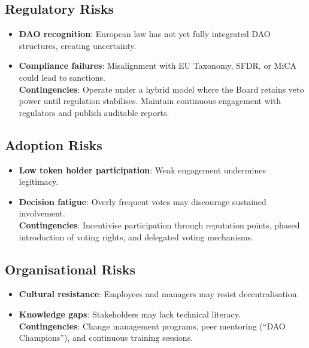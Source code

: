 \documentclass[
  english,
  12pt,
  oneside,
  open=any]{scrbook}
\providecommand{\tightlist}{%
  \setlength{\itemsep}{0pt}\setlength{\parskip}{0pt}}\usepackage{longtable,booktabs,array}
\begin{document}
\subsection{Regulatory Risks}\label{regulatory-risks}

\begin{itemize}
\tightlist
\item
  \textbf{DAO recognition}: European law has not yet fully integrated
  DAO structures, creating uncertainty.\\
\item
  \textbf{Compliance failures}: Misalignment with EU Taxonomy, SFDR, or
  MiCA could lead to sanctions.\\
  \textbf{Contingencies}: Operate under a hybrid model where the Board
  retains veto power until regulation stabilises. Maintain continuous
  engagement with regulators and publish auditable reports.
\end{itemize}

\subsection{Adoption Risks}\label{adoption-risks}

\begin{itemize}
\tightlist
\item
  \textbf{Low token holder participation}: Weak engagement undermines
  legitimacy.\\
\item
  \textbf{Decision fatigue}: Overly frequent votes may discourage
  sustained involvement.\\
  \textbf{Contingencies}: Incentivise participation through reputation
  points, phased introduction of voting rights, and delegated voting
  mechanisms.
\end{itemize}

\subsection{Organisational Risks}\label{organisational-risks}

\begin{itemize}
\tightlist
\item
  \textbf{Cultural resistance}: Employees and managers may resist
  decentralisation.\\
\item
  \textbf{Knowledge gaps}: Stakeholders may lack technical literacy.\\
  \textbf{Contingencies}: Change management programs, peer mentoring
  (``DAO Champions''), and continuous training sessions.
\end{itemize}
\end{document}
